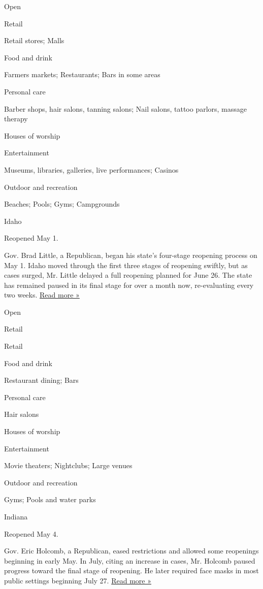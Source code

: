 Open

Retail

Retail stores; Malls

Food and drink

Farmers markets; Restaurants; Bars in some areas

Personal care

Barber shops, hair salons, tanning salons; Nail salons, tattoo parlors,
massage therapy

Houses of worship

Entertainment

Museums, libraries, galleries, live performances; Casinos

Outdoor and recreation

Beaches; Pools; Gyms; Campgrounds

Idaho

Reopened May 1.

Gov. Brad Little, a Republican, began his state's four-stage reopening
process on May 1. Idaho moved through the first three stages of
reopening swiftly, but as cases surged, Mr. Little delayed a full
reopening planned for June 26. The state has remained paused in its
final stage for over a month now, re-evaluating every two weeks.
\href{https://idahonews.com/news/coronavirus/gov-little-to-address-idahoans-about-stage-4-again}{Read
more »}

Open

Retail

Retail

Food and drink

Restaurant dining; Bars

Personal care

Hair salons

Houses of worship

Entertainment

Movie theaters; Nightclubs; Large venues

Outdoor and recreation

Gyms; Pools and water parks

Indiana

Reopened May 4.

Gov. Eric Holcomb, a Republican, eased restrictions and allowed some
reopenings beginning in early May. In July, citing an increase in cases,
Mr. Holcomb paused progress toward the final stage of reopening. He
later required face masks in most public settings beginning July 27.
\href{https://www.indystar.com/story/news/health/2020/07/29/indiana-coronavirus-stage-4-5-continue-through-least-aug-27/5538222002/}{Read
more »}

